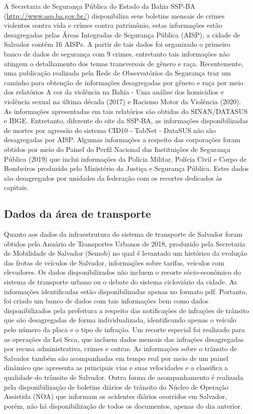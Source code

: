 \documentclass[
]{book}
\begin{document}
A Secretaria de Segurança Pública do Estado da Bahia SSP-BA (\url{http://www.ssp.ba.gov.br/}) disponibiliza seus boletins mensais de crimes violentos contra vida e crimes contra patrimônio, estas informações estão desagregadas pelas Áreas Integradas de Segurança Pública (AISP), a cidade de Salvador contém 16 AISPs. A partir de tais dados foi organizado o primeiro banco de dados de segurança com 9 crimes, entretanto tais informações não atingem o detalhamento dos temas transversais de gênero e raça. Recentemente, uma publicação realizada pela Rede de Observatórios da Segurança traz um caminho para obtenção de informações desagregadas por gênero e raça por meio dos relatórios A cor da violência na Bahia - Uma análise dos homicídios e violência sexual na última década (2017) e Racismo Motor da Violência (2020). As informações apresentadas em tais relatórios são obtidas do SINAN/DATASUS e IBGE. Entretanto, diferente do site da SSP-BA, as informações disponibilizadas de mortes por agressão do sistema CID10 - TabNet - DataSUS não são desagregadas por AISP. Algumas informações a respeito das corporações foram obtidos por meio do Painel do Perfil Nacional das Instituições de Segurança Pública (2019) que inclui informações da Polícia Militar, Polícia Civil e Corpo de Bombeiros produzido pelo Ministério da Justiça e Segurança Pública. Estes dados são desagregados por unidades da federação com os recortes dedicados às capitais.

\hypertarget{dados-da-uxe1rea-de-transporte}{%
\subsection{Dados da área de transporte}\label{dados-da-uxe1rea-de-transporte}}

Quanto aos dados da infraestrutura do sistema de transporte de Salvador foram obtidos pelo Anuário de Transportes Urbanos de 2018, produzido pela Secretaria de Mobilidade de Salvador (Semob) no qual é levantado um histórico da evolução das frotas de veículos de Salvador, informações sobre tarifas, veículos com elevadores. Os dados disponibilizados não incluem o recorte sócio-econômico do sistema de transporte urbano ou o debate do sistema cicloviário da cidade. As informações identificadas estão disponibilizadas apenas no formato pdf. Portanto, foi criado um banco de dados com tais informações bem como dados disponibilizados pela prefeitura a respeito das notificações de infrações de trânsito que são desagregadas de forma individualizada, identificando apenas o veículo pelo número da placa e o tipo de infração. Um recorte especial foi realizado para as operações da Lei Seca, que incluem dados mensais das infrações desagregadas por recusa administrativa, crimes e outras. As informações sobre o trânsito de Salvador também são acompanhadas em tempo real por meio de um painel dinâmico que apresenta as principais vias e suas velocidades e a classifica a qualidade do trânsito de Salvador. Outra forma de acompanhamento é realizada pela disponibilização de boletins diários de trânsito do Núcleo de Operação Assistida (NOA) que informam os acidentes diários ocorridos em Salvador, porém, não há disponibilização de todos os documentos, apenas do dia anterior.
\end{document}
